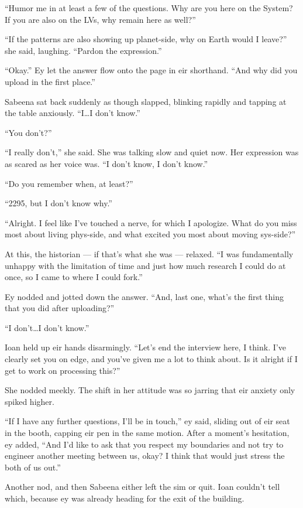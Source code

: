 ``Humor me in at least a few of the questions. Why are you here on the System? If you are also on the LVs, why remain here as well?''

``If the patterns are also showing up planet-side, why on Earth would I leave?'' she said, laughing. ``Pardon the expression.''

``Okay.'' Ey let the answer flow onto the page in eir shorthand. ``And why did you upload in the first place.''

Sabeena sat back suddenly as though slapped, blinking rapidly and tapping at the table anxiously. ``I\ldots I don't know.''

``You don't?''

``I really don't,'' she said. She was talking slow and quiet now. Her expression was as scared as her voice was. ``I don't know, I don't know.''

``Do you remember when, at least?''

``2295, but I don't know why.''

``Alright. I feel like I've touched a nerve, for which I apologize. What do you miss most about living phys-side, and what excited you most about moving sys-side?''

At this, the historian — if that's what she was — relaxed. ``I was fundamentally unhappy with the limitation of time and just how much research I could do at once, so I came to where I could fork.''

Ey nodded and jotted down the answer. ``And, last one, what's the first thing that you did after uploading?''

``I don't\ldots I don't know.''

Ioan held up eir hands disarmingly. ``Let's end the interview here, I think. I've clearly set you on edge, and you've given me a lot to think about. Is it alright if I get to work on processing this?''

She nodded meekly. The shift in her attitude was so jarring that eir anxiety only spiked higher.

``If I have any further questions, I'll be in touch,'' ey said, sliding out of eir seat in the booth, capping eir pen in the same motion. After a moment's hesitation, ey added, ``And I'd like to ask that you respect my boundaries and not try to engineer another meeting between us, okay? I think that would just stress the both of us out.''

Another nod, and then Sabeena either left the sim or quit. Ioan couldn't tell which, because ey was already heading for the exit of the building.


